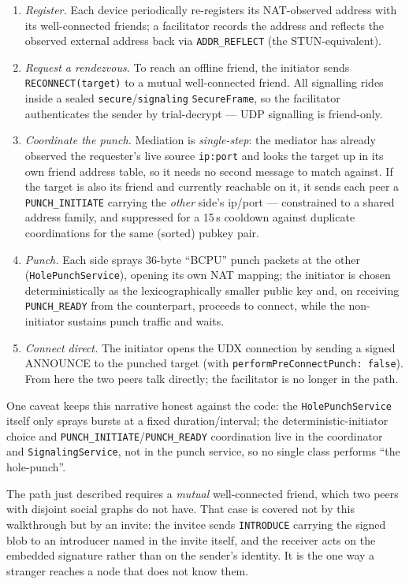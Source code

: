 \documentclass[11pt]{report}
\newcommand{\code}[1]{\texttt{\small #1}}
\begin{document}
\begin{enumerate}
  \item \emph{Register.} Each device periodically re-registers its
    NAT-observed address with its well-connected friends; a facilitator records the
    address and reflects the observed external address back via
    \code{ADDR\_REFLECT} (the STUN-equivalent).
  \item \emph{Request a rendezvous.} To reach an offline friend, the initiator
    sends \code{RECONNECT(target)} to a mutual well-connected friend. All
    signalling rides inside a
    sealed \code{secure}/\code{signaling} \code{SecureFrame}, so the facilitator
    authenticates the sender by trial-decrypt --- UDP signalling is friend-only.
  \item \emph{Coordinate the punch.} Mediation is \emph{single-step}: the
    mediator has already observed the requester's live source \code{ip:port} and
    looks the target up in its own friend address table, so it needs no second
    message to match against. If the target is also its friend and currently
    reachable on it, it sends each peer a \code{PUNCH\_INITIATE} carrying the
    \emph{other} side's ip/port --- constrained to a shared address family, and
    suppressed for a 15\,s cooldown against duplicate coordinations for the same
    (sorted) pubkey pair.
  \item \emph{Punch.} Each side sprays 36-byte ``BCPU'' punch packets at the
    other (\code{HolePunchService}), opening its own NAT mapping; the initiator
    is chosen deterministically as the lexicographically smaller public key and,
    on receiving \code{PUNCH\_READY} from the counterpart, proceeds to connect,
    while the non-initiator sustains punch traffic and waits.
  \item \emph{Connect direct.} The initiator opens the UDX connection by sending
    a signed ANNOUNCE to the punched target (with \code{performPreConnectPunch:
    false}). From here the two peers talk directly; the facilitator is no longer
    in the path.
\end{enumerate}

One caveat keeps this narrative honest against the code: the
\code{HolePunchService} itself only sprays bursts at a fixed duration/interval;
the deterministic-initiator choice and \code{PUNCH\_INITIATE}/\code{PUNCH\_READY}
coordination live in the coordinator and \code{SignalingService}, not in the
punch service, so no single class performs ``the hole-punch''.

The path just described requires a \emph{mutual} well-connected friend, which two
peers with disjoint social graphs do not have. That case is covered not by this
walkthrough but by an invite: the invitee sends \code{INTRODUCE} carrying the
signed blob to an introducer named in the invite itself, and the receiver acts on
the embedded signature rather than on the sender's identity. It is the one way a
stranger reaches a node that does not know them.
\end{document}
